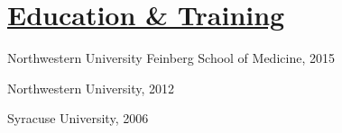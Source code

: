 \documentclass[]{winter-resume-openfont}
\begin{document}
\begin{minipage}[t]{0.3\textwidth}
\sectionsep
\sectionsep
\section{\underline{Education \& Training}}
\sectionsep
{} 
\begin{tightemize}
\sectionsep
\sectionsep
\item[] Northwestern University Feinberg School of Medicine, 2015
\end{tightemize}

\begin{tightemize}
\item[] Northwestern University, 2012
\end{tightemize}

\begin{tightemize}

\item[] Syracuse University, 2006
\end{tightemize}
\sectionsep



\end{minipage} 
\end{document}
